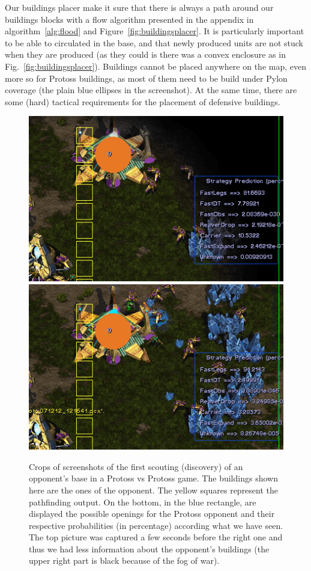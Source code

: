 Our buildings placer make it sure that there is always a path around our buildings blocks with a flow algorithm presented in the appendix in algorithm~\ref{alg:flood} and Figure~\ref{fig:buildingsplacer}. It is particularly important to be able to circulated in the base, and that newly produced units are not stuck when they are produced (as they could is there was a convex enclosure as in Fig.~\ref{fig:buildingsplacer}). Buildings cannot be placed anywhere on the map, even more so for Protoss buildings, as most of them need to be build under Pylon coverage (the plain blue ellipses in the screenshot). At the same time, there are some (hard) tactical requirements for the placement of defensive buildings.

\begin{figure}[h]
\begin{center}
\includegraphics[width=0.66\columnwidth]{images/botgame/scout1.png} %
\includegraphics[width=0.66\columnwidth]{images/botgame/scout2.png}
\caption{Crops of screenshots of the first scouting (discovery) of an opponent's base in a Protoss vs Protoss game. The buildings shown here are the ones of the opponent. The yellow squares represent the pathfinding output. On the bottom, in the blue rectangle, are displayed the possible openings for the Protoss opponent and their respective probabilities (in percentage) according what we have seen. The top picture was captured a few seconds before the right one and thus we had less information about the opponent's buildings (the upper right part is black because of the fog of war).}
\label{fig:bot_scout}
\end{center}
\end{figure}

